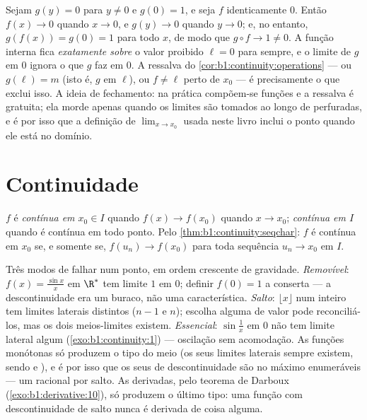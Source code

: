 \begin{example}\label{ex:b1:continuity:compositiontrap}
Sejam $g(y) = 0$ para $y \neq 0$ e $g(0) = 1$, e seja $f$
identicamente $0$. Então $f(x) \to 0$ quando $x \to 0$, e $g(y) \to 0$
quando $y \to 0$; e, no entanto, $g(f(x)) = g(0) = 1$ para todo $x$, de modo que $g
\circ f \to 1 \neq 0$. A função interna fica \emph{exatamente sobre}
o valor proibido $\ell = 0$ para sempre, e o limite de $g$ em $0$
ignora o que $g$ faz em $0$. A ressalva do
\cref{cor:b1:continuity:operations} --- ou $g(\ell) = m$
(isto é, $g$  em $\ell$), ou $f \neq \ell$ perto de $x_0$ ---
é precisamente o que exclui isso. A ideia de fechamento: na
prática compõem-se funções \emph{} e a ressalva é
gratuita; ela morde apenas quando os limites são tomados ao longo de
 perfuradas, e é por isso que a definição de
$\lim_{x \to x_0}$ usada neste livro inclui o ponto quando ele está
no domínio.
\end{example}

\section{Continuidade}

\begin{definition}\label{def:b1:continuity:continuous}
$f$ é \emph{contínua em $x_0 \in I$} quando $f(x)
\to f(x_0)$ quando $x \to x_0$; \emph{contínua em $I$} quando é
contínua em todo ponto. Pelo
\cref{thm:b1:continuity:seqchar}: $f$ é contínua em $x_0$ se, e somente se,
$f(u_n) \to f(x_0)$ para toda sequência $u_n \to x_0$ em $I$.
\end{definition}

\begin{example}\label{ex:b1:continuity:taxonomy}
Três modos de falhar num ponto, em ordem crescente de gravidade.
\emph{Removível}: $f(x) = \frac{\sin x}{x}$ em $\R^*$ tem limite
$1$ em $0$; definir $f(0) = 1$ a conserta --- a descontinuidade
era um buraco, não uma característica. \emph{Salto}: $\lfloor x \rfloor$ num
inteiro tem limites laterais distintos ($n - 1$ e $n$); escolha alguma
de valor pode reconciliá-los, mas os dois meios-limites existem.
\emph{Essencial}: $\sin\frac1x$ em $0$ não tem limite lateral algum
(\cref{exo:b1:continuity:1}) --- oscilação sem
acomodação. As funções monótonas só produzem o tipo do meio
(os seus limites laterais sempre existem, sendo  e ),
e é por isso que os seus  de descontinuidade são no máximo
enumeráveis --- um racional por salto. As derivadas, pelo teorema de
Darboux (\cref{exo:b1:derivative:10}), só produzem o último tipo:
uma função com descontinuidade de salto nunca é derivada de coisa
alguma.
\end{example}

